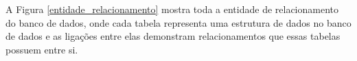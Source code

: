 A Figura \ref{entidade_relacionamento} mostra toda a entidade de relacionamento do banco de dados, onde cada tabela representa uma estrutura de dados no banco de dados e as ligações entre elas demonstram relacionamentos que essas tabelas possuem entre si.

